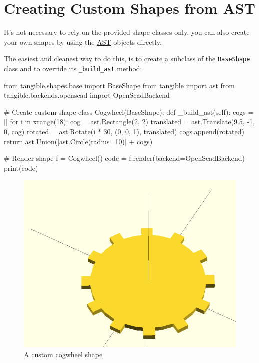 \newpage
\section{Creating Custom Shapes from AST}\label{sec:custom_ast}

It's not necessary to rely on the provided shape classes only, you can also
create your own shapes by using the \hyperref[sec:ast]{AST} objects directly.

The easiest and cleanest way to do this, is to create a subclass of the
\texttt{BaseShape} class and to override its \texttt{\_build\_ast} method:

\vspace{.5\baselineskip}
\begin{pythoncode}
from tangible.shapes.base import BaseShape
from tangible import ast
from tangible.backends.openscad import OpenScadBackend

# Create custom shape
class Cogwheel(BaseShape):
    def _build_ast(self):
        cogs = []
        for i in xrange(18):
            cog = ast.Rectangle(2, 2)
            translated = ast.Translate(9.5, -1, 0, cog)
            rotated = ast.Rotate(i * 30, (0, 0, 1), translated)
            cogs.append(rotated)
        return ast.Union([ast.Circle(radius=10)] + cogs)

# Render shape
f = Cogwheel()
code = f.render(backend=OpenScadBackend)
print(code)
\end{pythoncode}
\vspace{.5\baselineskip}

\begin{figure}[H]
	\centering
	\includegraphics[height=.3\textheight]{images/cogwheel.png}
	\caption{A custom cogwheel shape}
	\label{img:cogwheel}
\end{figure}
